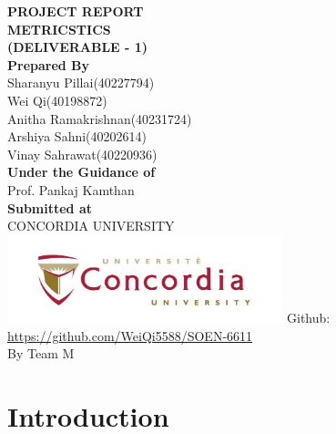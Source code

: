\documentclass[english,12pt,a4paper]{report}
\begin{document}
	\begin{titlepage}
		\centering
		\Huge
		\textbf{PROJECT REPORT}\\
		\vspace{1cm}
		\textbf{METRICSTICS}\\
		\textbf{(DELIVERABLE - 1)}\\
		\vspace{1.5cm}
		\Large
		\textbf{Prepared By}\\
		\vspace{0.5cm}
		Sharanyu Pillai(40227794)\\
		Wei Qi(40198872)\\
		Anitha Ramakrishnan(40231724)\\
		Arshiya Sahni(40202614)\\
		Vinay Sahrawat(40220936)\\
		\vspace{1.5cm}
		\large
		\textbf{Under the Guidance of}\\
		Prof. Pankaj Kamthan \\
		\vspace{1.5cm}
		\textbf{Submitted at}\\
		CONCORDIA UNIVERSITY\\
		\centering
		\includegraphics[width=8cm]{concordia.jpg}
		\vfill
		Github:\\
		\url{https://github.com/WeiQi5588/SOEN-6611} \\
		By Team M
		\thispagestyle{empty} 
	\end{titlepage}
	
	\newpage 
	\setcounter{page}{0}
	\tableofcontents
	\clearpage
	
	

	
	\chapter{Introduction}
\end{document}
